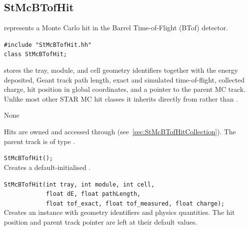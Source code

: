 
%
%
\subsection{StMcBTofHit}
 
\label{sec:StMcBTofHit}
\begin{Entry}
\item[Summary]
     represents a Monte Carlo hit in the Barrel
    Time-of-Flight (BTof) detector.

\item[Synopsis]
    \verb+#include "StMcBTofHit.hh"+\\
    \verb+class StMcBTofHit;+\\

\item[Description]
     stores the tray, module, and cell geometry
    identifiers together with the energy deposited, Geant track path
    length, exact and simulated time-of-flight, collected charge,
    hit position in global coordinates, and a pointer to the parent
    MC track.  Unlike most other STAR MC hit classes it inherits
    directly from  rather than .

\item[Persistence]
    None

\item[Related Classes]
    Hits are owned and accessed through
     (see~\ref{sec:StMcBTofHitCollection}).
    The parent track is of type .

\item[Public\\ Constructors]
    \verb+StMcBTofHit();+\\
    Creates a default-initialised .

    \verb+StMcBTofHit(int tray, int module, int cell,+\\
    \verb+            float dE, float pathLength,+\\
    \verb+            float tof_exact, float tof_measured, float charge);+\\
    Creates an instance with geometry identifiers and physics
    quantities.  The hit position and parent track pointer are
    left at their default values.


\end{Entry}
